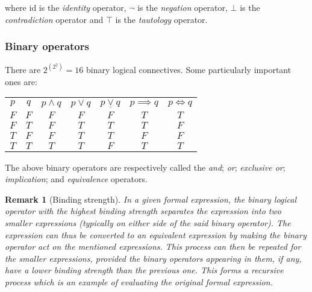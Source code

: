 \documentclass[12pt]{article}
\newtheorem{remark}{Remark}[section]
\begin{document}
where $\text{id}$ is the \emph{identity} operator, $\lnot$ is the \emph{negation} operator, $\bot$ is the \emph{contradiction} operator and $\top$ is the \emph{tautology} operator.

\subsubsection{Binary operators}

There are $2^{\left( 2^2 \right)} = 16$ binary logical connectives. Some particularly important ones are:

\begin{center}
\begin{tabular}{|c|c||c|c|c|c|c|}
\hline
$p$ & $q$ & $p \land q$ & $p \lor q$ & $p \underline{\lor} q$ & $p \implies q$ & $p \Longleftrightarrow q$ \\
\hhline{|=|=||=|=|=|=|=|}
$F$ & $F$ & $F$ & $F$ & $F$ & $T$ & $T$ \\
\hline
$F$ & $T$ & $F$ & $T$ & $T$ & $T$ & $F$ \\
\hline
$T$ & $F$ & $F$ & $T$ & $T$ & $F$ & $F$ \\
\hline
$T$ & $T$ & $T$ & $T$ & $F$ & $T$ & $T$ \\
\hline
\end{tabular}
\end{center}

The above binary operators are respectively called the \emph{and}; \emph{or}; \emph{exclusive or}; \emph{implication}; and \emph{equivalence} operators.

\begin{remark}[Binding strength]
In a given formal expression, the binary logical operator with the highest \emph{binding strength} separates the expression into two smaller expressions (typically on either side of the said binary operator). The expression can thus be converted to an equivalent expression by making the binary operator act on the mentioned expressions. This process can then be repeated for the smaller expressions, provided the binary operators appearing in them, if any, have a lower binding strength than the previous one. This forms a recursive process which is an example of \emph{evaluating} the original formal expression.
\end{remark}
\end{document}
